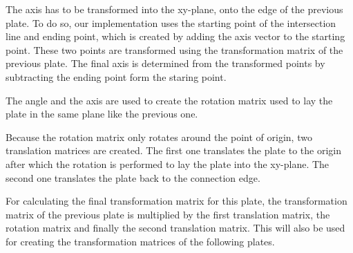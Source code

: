 \documentclass[../ClassicThesis.tex]{subfiles}
\begin{document}
The axis has to be transformed into the xy-plane, onto the edge of the previous plate. To do so, our implementation uses the starting point of the intersection line and ending point, which is created by adding the axis vector to the starting point. These two points are transformed using the transformation matrix of the previous plate. The final axis is determined from the transformed points by subtracting the ending point form the staring point.

The angle and the axis are used to create the rotation matrix used to lay the plate in the same plane like the previous one.

Because the rotation matrix only rotates around the point of origin, two translation matrices are created. The first one translates the plate to the origin after which the rotation is performed to lay the plate into the xy-plane. The second one translates the plate back to the connection edge.

For calculating the final transformation matrix for this plate, the transformation matrix of the previous plate is multiplied by the first translation matrix, the rotation matrix and finally the second translation matrix. This will also be used for creating the transformation matrices of the following plates.
\end{document}
